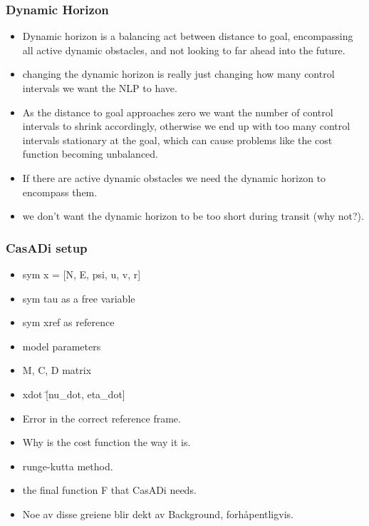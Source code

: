 \subsubsection{Dynamic Horizon}
\begin{itemize}
    \item Dynamic horizon is a balancing act between distance to goal, encompassing all active dynamic obstacles, and not looking to far ahead into the future.
    \item changing the dynamic horizon is really just changing how many control intervals we want the NLP to have.
    \item As the distance to goal approaches zero we want the number of control intervals to shrink accordingly, otherwise we end up with too many control intervals stationary at the goal, which can cause problems like the cost function becoming unbalanced.
    \item If there are active dynamic obstacles we need the dynamic horizon to encompass them.
    \item we don't want the dynamic horizon to be too short during transit (why not?).
\end{itemize}

\subsubsection{CasADi setup}
\begin{itemize}
    \item sym x = [N, E, psi, u, v, r]
    \item sym tau as a free variable
    \item sym xref as reference
    \item model parameters
    \item M, C, D matrix
    \item xdot \= [nu\_dot, eta\_dot]
    \item Error in the correct reference frame.
    \item Why is the cost function the way it is.
    \item runge-kutta method.
    \item the final function F that CasADi needs.
    \item Noe av disse greiene blir dekt av Background, forhåpentligvis.
\end{itemize}

